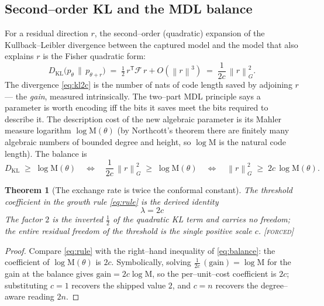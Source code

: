 \documentclass[11pt]{article}
\theoremstyle{plain}
\newtheorem{theorem}{Theorem}[section]
\theoremstyle{definition}
\theoremstyle{remark}
\newcommand{\forced}{\textcolor{forcedc}{\textsc{[forced]}}}
\newcommand{\KL}{D_{\mathrm{KL}}}
\newcommand{\Mah}{\mathrm{M}}
\newcommand{\norm}[1]{\left\lVert #1 \right\rVert}
\begin{document}
\subsection{Second--order KL and the MDL balance}

For a residual direction $r$, the second--order (quadratic) expansion of the Kullback--Leibler divergence between the captured model and the model that also explains $r$ is the Fisher quadratic form:
\begin{equation}\label{eq:kl2c}
\KL\bigl(p_\theta \,\|\, p_{\theta+r}\bigr) \;=\; \tfrac12\, r^{\mathsf T}\mathcal F\, r + O(\norm{r}^3) \;=\; \frac{1}{2c}\,\norm{r}^2_G .
\end{equation}
The divergence \eqref{eq:kl2c} is the number of nats of code length saved by adjoining $r$ --- the \emph{gain}, measured intrinsically. The two--part MDL principle says a parameter is worth encoding iff the bits it saves meet the bits required to describe it. The description cost of the new algebraic parameter is its Mahler measure logarithm $\log\Mah(\theta)$ (by Northcott's theorem there are finitely many algebraic numbers of bounded degree and height, so $\log\Mah$ is the natural code length). The balance is
\begin{equation}\label{eq:balance}
\KL \;\ge\; \log\Mah(\theta) \quad\Longleftrightarrow\quad \frac{1}{2c}\,\norm{r}^2_G \;\ge\; \log\Mah(\theta) \quad\Longleftrightarrow\quad \norm{r}^2_G \;\ge\; 2c\,\log\Mah(\theta).
\end{equation}

\begin{theorem}[The exchange rate is twice the conformal constant]\label{thm:lambda2c}
The threshold coefficient in the growth rule \eqref{eq:rule} is the derived identity
\begin{equation}\label{eq:lambda2c}
\boxed{\;\lambda = 2c\;}
\end{equation}
The factor $2$ is the inverted $\tfrac12$ of the quadratic KL term and carries no freedom; the entire residual freedom of the threshold is the single positive scale $c$. \forced
\end{theorem}

\begin{proof}
Compare \eqref{eq:rule} with the right--hand inequality of \eqref{eq:balance}: the coefficient of $\log\Mah(\theta)$ is $2c$. Symbolically, solving $\tfrac{1}{2c}\,(\text{gain}) = \log\Mah$ for the gain at the balance gives $\text{gain} = 2c\log\Mah$, so the per--unit--cost coefficient is $2c$; substituting $c=1$ recovers the shipped value $2$, and $c=n$ recovers the degree--aware reading $2n$.
\end{proof}
\end{document}
